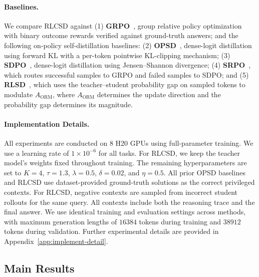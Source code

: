 \paragraph{Baselines.} We compare RLCSD against (1) \textbf{GRPO}~\citep{shao2024deepseekmath}, group relative policy optimization with binary outcome rewards verified against ground-truth answers; and the following on-policy self-distillation baselines: (2) \textbf{OPSD}~\citep{zhao2026self}, dense-logit distillation using forward KL with a per-token pointwise KL-clipping mechanism; (3) \textbf{SDPO}~\citep{hubotter2026reinforcement}, dense-logit distillation using Jensen--Shannon divergence; (4) \textbf{SRPO}~\citep{li2026unifying}, which routes successful samples to GRPO and failed samples to SDPO; and (5) \textbf{RLSD}~\citep{yang2026self}, which uses the teacher--student probability gap on sampled tokens to modulate $A_\text{ORM}$, where $A_\text{ORM}$ determines the update direction and the probability gap determines its magnitude.

\paragraph{Implementation Details.} All experiments are conducted on 8 H20 GPUs using full-parameter training. We use a learning rate of $1\times 10^{-6}$ for all tasks. For RLCSD, we keep the teacher model's weights fixed throughout training. The remaining hyperparameters are set to $K=4$, $\tau=1.3$, $\lambda=0.5$, $\delta=0.02$, and $\eta=0.5$. All prior OPSD baselines and RLCSD use dataset-provided ground-truth solutions as the correct privileged contexts. For RLCSD, negative contexts are sampled from incorrect student rollouts for the same query. All contexts include both the reasoning trace and the final answer. We use identical training and evaluation settings across methods, with maximum generation lengths of $16384$ tokens during training and $38912$ tokens during validation. Further experimental details are provided in Appendix~\ref{app:implement-detail}.

\subsection{Main Results}
\label{sec:exp-main}


